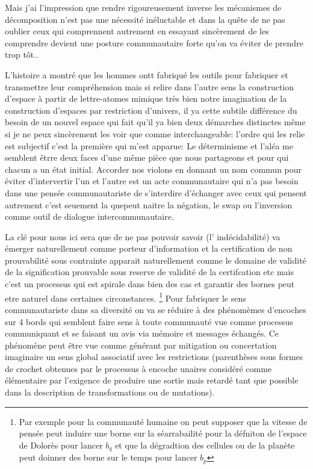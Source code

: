 \documentclass{article}
\begin{document}
Mais j'ai l'impression  que rendre rigoureusement inverse les mécanismes de décomposition n'est pas une nécessité inéluctable et dans la quête de ne pas oublier ceux qui comprennent autrement en essayant sincèrement de les comprendre devient une posture communautaire forte qu'on va éviter de prendre trop tôt..

L'histoire a montré que les hommes ontt fabriqué les outils pour fabriquer et transmettre leur compréhension mais si relire dans l'autre sens la construction d'espace à partir de lettre-atomes  mimique très bien notre imagination de la construction d'espaces par restriction d'univers, il ya cette subtile différence du besoin de un nouvel espace qui fait qu'il ya bien deux démarches distinctes  même si je ne peux sincèrement les voir que comme interchangeable: l'ordre qui les relie est subjectif c'est la première qui m'est apparue: Le déterminisme et l'aléa me semblent êtrre deux faces d'une même pièce que nous partageons et pour qui chacun a un état initial. Accorder nos violons en donnant un nom commun pour éviter d'intervertir l'un et l'autre est un acte communautaire qui n'a pas besoin dans une pensée communautariste de s'interdire d'échanger avec ceux qui pensent autrement c'est seuement la quepeut naitre la négation, le swap ou l'inversion comme outil de dialogue intercommunautaire.  


 La clé pour nous ici sera que de ne pas pouvoir savoir (l' indécidabilité)  va émerger naturellement comme porteur d'information et la certification de non prouvabilité sous contrainte apparait naturellement comme le domaine de validité de la signification prouvable sous reserve de validité de la certifcation etc mais c'est un processus qui est spirale dans bien des cas et garantir des bornes peut etre naturel dans certaines circonstances. \footnote{Par exemple pour la communauté humaine on peut supposer que la vitesse de pensée peut induire une borne sur la séarrabailité  pour la défniton de l'espace de Dolorès  pour lancer $b_q$ et que la dégradtion des cellules ou de la planète peut doinner des borne sur le temps pour lancer $b_p$}
 Pour fabriquer le sens communautariste dans sa diversité on va  se réduire  à des phénomèmes d'encoches sur 4 bords qui semblent faire sens à toute communauté vue comme processus communiquant et se faisant un avis via mémoire et messages échangés. Ce phénomène peut être vue comme générant par mitigation ou concertation imaginaire 
 un sens global associatif avec les restrictions (parenthèses sous formes de crochet obtenues par le processus à encoche unaires considéré comme élémentaire par l'exigence de produire une sortie mais retardé tant que possible dans la description de transformations ou de mutations).
 
\end{document}
